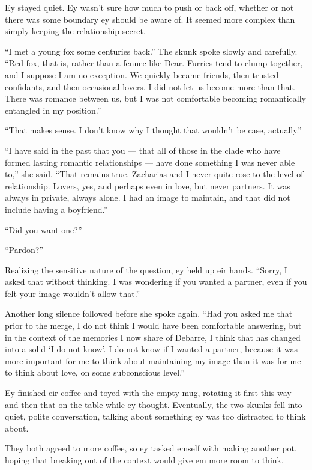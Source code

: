 Ey stayed quiet. Ey wasn't sure how much to push or back off, whether or not there was some boundary ey should be aware of. It seemed more complex than simply keeping the relationship secret.

``I met a young fox some centuries back.'' The skunk spoke slowly and carefully. ``Red fox, that is, rather than a fennec like Dear. Furries tend to clump together, and I suppose I am no exception. We quickly became friends, then trusted confidants, and then occasional lovers. I did not let us become more than that. There was romance between us, but I was not comfortable becoming romantically entangled in my position.''

``That makes sense. I don't know why I thought that wouldn't be case, actually.''

``I have said in the past that you — that all of those in the clade who have formed lasting romantic relationships — have done something I was never able to,'' she said. ``That remains true. Zacharias and I never quite rose to the level of relationship. Lovers, yes, and perhaps even in love, but never partners. It was always in private, always alone. I had an image to maintain, and that did not include having a boyfriend.''

``Did you want one?''

``Pardon?''

Realizing the sensitive nature of the question, ey held up eir hands. ``Sorry, I asked that without thinking. I was wondering if you wanted a partner, even if you felt your image wouldn't allow that.''

Another long silence followed before she spoke again. ``Had you asked me that prior to the merge, I do not think I would have been comfortable answering, but in the context of the memories I now share of Debarre, I think that has changed into a solid `I do not know'. I do not know if I wanted a partner, because it was more important for me to think about maintaining my image than it was for me to think about love, on some subconscious level.''

Ey finished eir coffee and toyed with the empty mug, rotating it first this way and then that on the table while ey thought. Eventually, the two skunks fell into quiet, polite conversation, talking about something ey was too distracted to think about.

They both agreed to more coffee, so ey tasked emself with making another pot, hoping that breaking out of the context would give em more room to think.

